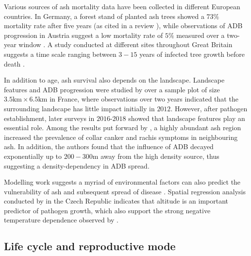 Various sources of ash mortality data have been collected in different European countries.
In Germany, a forest stand of planted ash trees showed a $73\%$
mortality rate after five years \cite{langer2015ash} (as cited in a review
\cite{enderle2017ash}), while observations of ADB progression in Austria
suggest a low mortality rate of $5\%$ measured over a two-year window \cite{kessler2012dieback}. 
A study conducted at different sites throughout Great Britain suggests a time scale ranging between 
$3-15$ years of infected tree growth before death \cite{wylder2018evidence}.

In addition to age, ash survival also depends on the landscape. 
Landscape features and ADB progression were studied by \cite{https://doi.org/10.1111/1365-2745.13383} 
over a sample plot of size  $\mathrm{3.5km \times 6.5 km}$ in France, where observations over two years
indicated that the surrounding landscape has little impact initially in $2012$. However, after pathogen establishment, 
later surveys in $2016$-$2018$ showed that landscape features play an essential role.
Among the results put forward by \cite{https://doi.org/10.1111/1365-2745.13383}, 
a highly abundant ash region increased the prevalence of collar canker and rachis symptoms in neighbouring ash.
In addition, the authors found that the influence of ADB decayed exponentially up to $200-300\mathrm{m}$ away from the high density source,
thus suggesting a density-dependency in ADB spread.

Modelling work suggests a myriad of environmental factors can also predict the
vulnerability of ash and subsequent spread of disease \cite{dal2014risk}.
Spatial regression analysis conducted by \cite{chumanova2019predicting} in the Czech Republic indicates that altitude 
is an important predictor of pathogen growth, which also support the strong negative temperature dependence observed by \cite{hauptman2013temperature}.

\subsection{Life cycle and reproductive mode}

